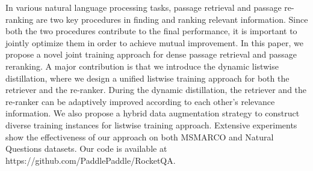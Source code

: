 In various natural language processing tasks, passage retrieval and passage re-ranking are two key procedures in finding and ranking relevant information. Since both the two procedures contribute to the final performance, it is important to jointly optimize them in order to achieve mutual improvement. In this paper, we propose a novel joint training approach for dense passage retrieval and passage reranking. A major contribution is that we introduce the dynamic listwise distillation, where we design a unified listwise training approach for both the retriever and the re-ranker. During the dynamic distillation, the retriever and the re-ranker can be adaptively improved according to each other's relevance information. We also propose a hybrid data augmentation strategy to construct diverse training instances for listwise training approach. Extensive experiments show the effectiveness of our approach on both MSMARCO and Natural Questions datasets. Our code is available at https://github.com/PaddlePaddle/RocketQA.
